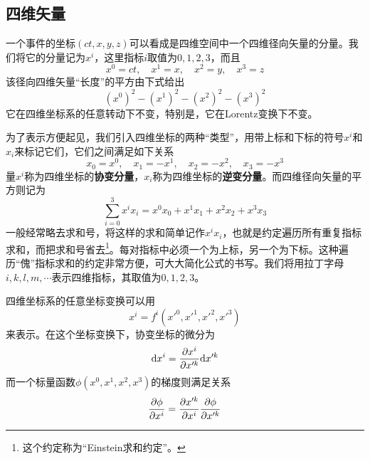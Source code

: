 \subsection{四维矢量}

一个事件的坐标$(ct,x,y,z)$可以看成是四维空间中一个四维径向矢量的分量。我们将它的分量记为$x^i$，这里指标$i$取值为$0,1,2,3$，而且
\begin{equation*}
	x^0 = ct,\quad x^1 = x,\quad x^2 = y,\quad x^3 = z
\end{equation*}
该径向四维矢量“长度”的平方由下式给出
\begin{equation*}
	(x^0)^2-(x^1)^2-(x^2)^2-(x^3)^2
\end{equation*}
它在四维坐标系的任意转动下不变，特别是，它在Lorentz变换下不变。

为了表示方便起见，我们引入四维坐标的两种“类型”，用带上标和下标的符号$x^i$和$x_i$来标记它们，它们之间满足如下关系
\begin{equation}
	x_0 = x^0,\quad x_1 = -x^1,\quad x_2 = -x^2,\quad x_3 = -x^3
	\label{chapter1:四维逆变坐标}
\end{equation}
量$x^i$称为四维坐标的{\bf 协变分量}，$x_i$称为四维坐标的{\bf 逆变分量}。而四维径向矢量的平方则记为
\begin{equation*}
	\sum_{i=0}^3 x^ix_i = x^0x_0+x^1x_1+x^2x_2+x^3x_3
\end{equation*}
一般经常略去求和号，将这样的求和简单记作$x^ix_i$，也就是约定遍历所有重复指标求和，而把求和号省去\footnote{这个约定称为“Einstein求和约定”。}。每对指标中必须一个为上标，另一个为下标。这种遍历“傀”指标求和的约定非常方便，可大大简化公式的书写。我们将用拉丁字母$i,k,l,m,\cdots$表示四维指标，其取值为$0,1,2,3$。

四维坐标系的任意坐标变换可以用
\begin{equation}
	x^i = f^i(x'^0,x'^1,x'^2,x'^3)
\end{equation}
来表示。在这个坐标变换下，协变坐标的微分为
\begin{equation}
	\mathrm{d} x^i = \frac{\partial x^i}{\partial x'^k} \mathrm{d} x'^k
	\label{chapter1:协变坐标微分的变换式}
\end{equation}
而一个标量函数$\phi(x^0,x^1,x^2,x^3)$的梯度则满足关系
\begin{equation}
	\frac{\partial \phi}{\partial x^i} = \frac{\partial x'^k}{\partial x^i} \frac{\partial \phi}{\partial x'^k}
	\label{chapter1:标量函数梯度的变换式}
\end{equation}

